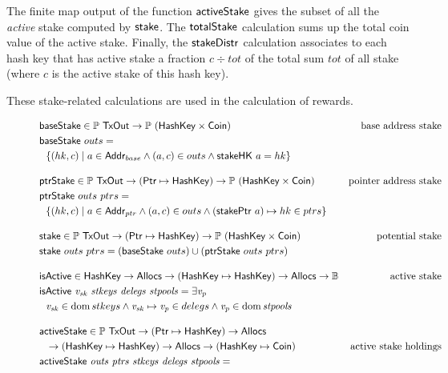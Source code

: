 The finite map output of the function $\mathsf{activeStake}$ gives the subset of
all the \textit{active} stake computed by $\mathsf{stake}$. The $\mathsf{totalStake}$
calculation sums up the total coin value of the active stake. Finally, the
$\mathsf{stakeDistr}$ calculation associates to each hash key that has active
stake a fraction $c \div tot$ of the total sum $tot$ of all stake (where $c$
is the active stake of this hash key).

These stake-related calculations are used in the calculation of rewards.

\begin{figure}[htb]
  \begin{align*}
      & \fun{baseStake} \in \powerset{\TxOut} \to \powerset{(\HashKey \times \Coin)}
      & \text{base address stake} \\
      & \fun{baseStake}~{outs} = \\
      & ~~ \{(hk, c) \mid a\in\Addr_{base} \land (a, c) \in outs \land \fun{stakeHK}~a = hk \}
      \nextdef
      & \fun{ptrStake} \in \powerset{\TxOut} \to (\Ptr \mapsto \HashKey)
          \to \powerset{(\HashKey \times \Coin)}
      & \text{pointer address stake} \\
      & \fun{ptrStake}~{outs}~{ptrs} = \\
      & ~~ \{(hk, c) \mid a\in\Addr_{ptr} \land (a, c) \in outs \land (\fun{stakePtr}~a)\mapsto hk \in ptrs \}
      \nextdef
      & \fun{stake} \in \powerset{\TxOut} \to (\Ptr \mapsto \HashKey)
          \to \powerset{(\HashKey \times \Coin)}
      & \text{potential stake} \\
      & \fun{stake}~{outs}~{ptrs} = (\fun{baseStake}~{outs}) \cup (\fun{ptrStake}~{outs}~{ptrs})
      \nextdef
      & \fun{isActive} \in \HashKey \to \Allocs \to (\HashKey \mapsto \HashKey) \to \Allocs \to \mathbb{B}
      & \text{active stake} \\
      & \isActive{v_{sk}}{stkeys}{delegs}{stpools} = \exists \var{v_{p}}\\
      & ~~ \var{v_{sk}} \in \dom stkeys
              \land \var{v_{sk}}\mapsto\var{v_{p}} \in delegs
              \land \var{v_{p}} \in \dom \var{stpools}
      \nextdef
      & \fun{activeStake} \in \powerset{\TxOut} \to (\Ptr \mapsto \HashKey) \to \Allocs\\
      & ~~\to (\HashKey \mapsto \HashKey) \to \Allocs \to (\HashKey \mapsto \Coin)
      & \text{active stake holdings} \\
      & \activeStake{outs}{ptrs}{stkeys}{delegs}{stpools} = \\

\end{align*}
\end{figure}
